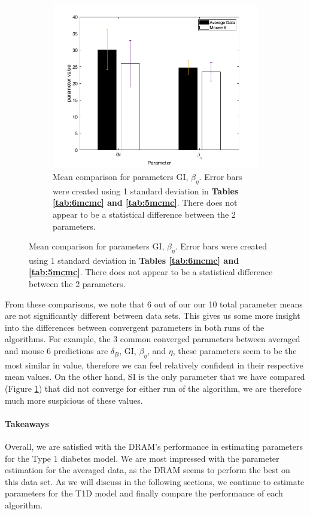 \begin{figure}[H]
\begin{subfigure}{.5\textwidth}
    \label{fig:23mcmc}
\end{subfigure}
\begin{center}
\begin{subfigure}{.5\textwidth}
    \centering
    \includegraphics[width=.8\linewidth]{MCMC_figs/dram_t1d_final/mouse6_avg_paramComp2.png}
    \caption{Mean comparison for parameters GI, $\beta_{\eta}$. Error bars were created using 1 standard deviation in \textbf{Tables \ref{tab:6mcmc} and \ref{tab:5mcmc}}. There does not appear to be a statistical difference between the 2 parameters.}
    \label{fig:24mcmc}
\end{subfigure}
\end{center}
\end{figure} 


From these comparisons, we note that 6 out of our our 10 total parameter means are not significantly different between data sets. This gives us some more insight into the differences between convergent parameters in both runs of the algorithms. For example, the 3 common converged parameters between averaged and mouse 6 predictions are $\delta_B$, GI, $\beta_{\eta}$, and $\eta$, these parameters seem to be the most similar in value, therefore we can feel relatively confident in their respective mean values. On the other hand, SI is the only parameter that we have compared (Figure \ref{fig:23mcmc}) that did not converge for either run of the algorithm, we are therefore much more suspicious of these values. 

\paragraph{Takeaways}
Overall, we are satisfied with the DRAM's performance in estimating parameters for the Type 1 diabetes model. We are most impressed with the parameter estimation for the averaged data, as the DRAM seems to perform the best on this data set. As we will discuss in the following sections, we continue to estimate parameters for the T1D model and finally compare the performance of each algorithm.
